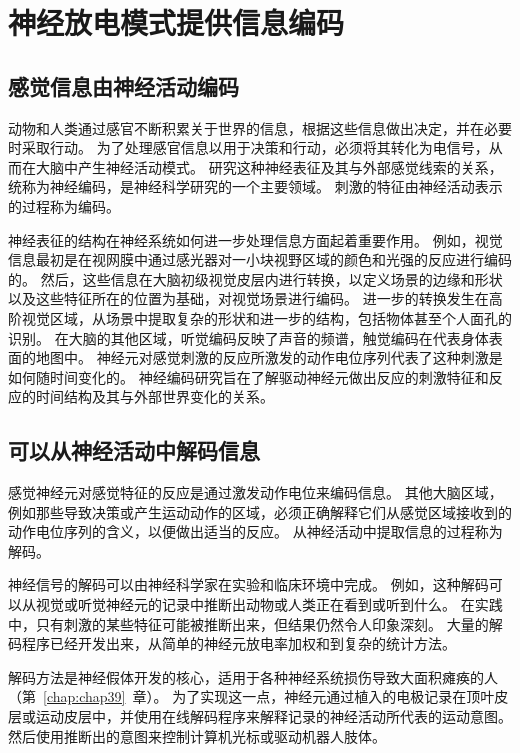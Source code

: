 \section{神经放电模式提供信息编码}

\subsection{感觉信息由神经活动编码}

动物和人类通过感官不断积累关于世界的信息，根据这些信息做出决定，并在必要时采取行动。
为了处理感官信息以用于决策和行动，必须将其转化为电信号，从而在大脑中产生神经活动模式。
研究这种神经表征及其与外部感觉线索的关系，统称为神经编码，是神经科学研究的一个主要领域。
刺激的特征由神经活动表示的过程称为编码。


神经表征的结构在神经系统如何进一步处理信息方面起着重要作用。
例如，视觉信息最初是在视网膜中通过感光器对一小块视野区域的颜色和光强的反应进行编码的。
然后，这些信息在大脑初级视觉皮层内进行转换，以定义场景的边缘和形状以及这些特征所在的位置为基础，对视觉场景进行编码。
进一步的转换发生在高阶视觉区域，从场景中提取复杂的形状和进一步的结构，包括物体甚至个人面孔的识别。
在大脑的其他区域，听觉编码反映了声音的频谱，触觉编码在代表身体表面的地图中。
神经元对感觉刺激的反应所激发的动作电位序列代表了这种刺激是如何随时间变化的。
神经编码研究旨在了解驱动神经元做出反应的刺激特征和反应的时间结构及其与外部世界变化的关系。



\subsection{可以从神经活动中解码信息}

感觉神经元对感觉特征的反应是通过激发动作电位来编码信息。
其他大脑区域，例如那些导致决策或产生运动动作的区域，必须正确解释它们从感觉区域接收到的动作电位序列的含义，以便做出适当的反应。
从神经活动中提取信息的过程称为解码。


神经信号的解码可以由神经科学家在实验和临床环境中完成。
例如，这种解码可以从视觉或听觉神经元的记录中推断出动物或人类正在看到或听到什么。
在实践中，只有刺激的某些特征可能被推断出来，但结果仍然令人印象深刻。
大量的解码程序已经开发出来，从简单的神经元放电率加权和到复杂的统计方法。


解码方法是神经假体开发的核心，适用于各种神经系统损伤导致大面积瘫痪的人（第~\ref{chap:chap39}~章）。
为了实现这一点，神经元通过植入的电极记录在顶叶皮层或运动皮层中，并使用在线解码程序来解释记录的神经活动所代表的运动意图。
然后使用推断出的意图来控制计算机光标或驱动机器人肢体。


